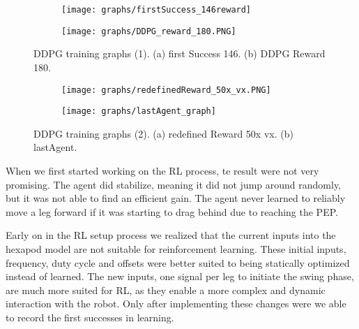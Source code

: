 \begin{figure}[h]
	\begin{subfigure}{\textwidth} %
		\centering
		\texttt{[image: graphs/firstSuccess\_146reward]}  %
		\caption{}
		\label{figure: RL a}
	\end{subfigure}
	\begin{subfigure}{\textwidth}
		\centering
		\texttt{[image: graphs/DDPG\_reward\_180.PNG]}  
		\caption{}
		\label{figure: RL b}
	\end{subfigure} 
		\caption[DDPG training graphs (1)]{DDPG training graphs (1). (a) first Success 146. (b) DDPG Reward 180.}
	\label{figure: DDPG learning graphs 1}
\end{figure}

\begin{figure}[h]
	\begin{subfigure}{\textwidth} %
		\centering
		\texttt{[image: graphs/redefinedReward\_50x\_vx.PNG]}  %
		\caption{}
		\label{figure: RL c}
	\end{subfigure}
	\begin{subfigure}{\textwidth}
		\centering
		\texttt{[image: graphs/lastAgent\_graph]}  
		\caption{}
		\label{figure: RL d}
	\end{subfigure} 
	\caption[DDPG training graphs (2)]{DDPG training graphs (2).  (a) redefined Reward 50x vx. (b) lastAgent.}
	\label{figure: DDPG learning graphs 2}
\end{figure}



When we first started working on the RL process, te result were not very promising. The agent did stabilize, meaning it did not jump around randomly, but it was not able to find an efficient gain.
The agent never learned to reliably move a leg forward if it was starting to drag behind due to reaching the PEP.

Early on in the RL setup process we realized that the current inputs into the hexapod model are not suitable for reinforcement learning.
These initial inputs, frequency, duty cycle and offsets were better suited to being statically optimized instead of learned.
The new inputs, one signal per leg to initiate the swing phase, are much more suited for RL, as they enable a more complex and dynamic interaction with the robot.
Only after implementing these changes were we able to record the first successes in learning.



